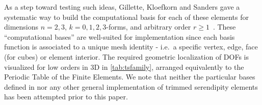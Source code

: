\documentclass[format=acmsmall,screen,timestamp=false,a4paper]{acmart}
\newcommand\josh[1]{\textbf{\textcolor[rgb]{0,.5,1}{[Josh: #1]}}}
\newcommand{\calP}{\mathcal{P}}
\newcommand{\calS}{\mathcal{S}}
\begin{document}

    
    
  
  

  
	
As a step toward testing such ideas, Gillette, Kloefkorn and Sanders gave a systematic way to build the computational basis for each of these elements for dimensions $n = 2, 3$, $k=0, 1, 2, 3$-forms, and arbitrary order $r \geq 1$~\cite{gillette2019computational}.
These ``computational bases'' are well-suited for implementation since each basis function is associated to a unique mesh identity - i.e.\ a specific vertex, edge, face (for cubes) or element interior.
The required geometric localization of DOFs is visualized for low orders in 3D in \cref{tab:tsfamily}, arranged equivalently to the Periodic Table of the Finite Elements.
We note that neither the particular bases defined in \citet{gillette2019computational} nor any other general implementation of trimmed serendipity elements has been attempted prior to this paper.
\end{document}
